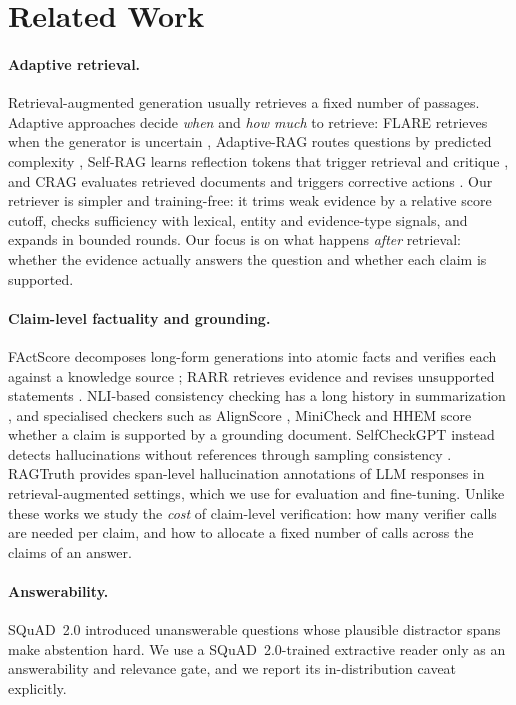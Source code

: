 \section{Related Work}
\label{sec:related}

\paragraph{Adaptive retrieval.}
Retrieval-augmented generation \citep{lewis2020rag} usually retrieves a fixed number of passages.
Adaptive approaches decide \emph{when} and \emph{how much} to retrieve: FLARE retrieves when the generator is uncertain \citep{jiang2023flare}, Adaptive-RAG routes questions by predicted complexity \citep{jeong2024adaptiverag}, Self-RAG learns reflection tokens that trigger retrieval and critique \citep{asai2024selfrag}, and CRAG evaluates retrieved documents and triggers corrective actions \citep{yan2024crag}.
Our retriever is simpler and training-free: it trims weak evidence by a relative score cutoff, checks sufficiency with lexical, entity and evidence-type signals, and expands in bounded rounds.
Our focus is on what happens \emph{after} retrieval: whether the evidence actually answers the question and whether each claim is supported.

\paragraph{Claim-level factuality and grounding.}
FActScore decomposes long-form generations into atomic facts and verifies each against a knowledge source \citep{min2023factscore}; RARR retrieves evidence and revises unsupported statements \citep{gao2023rarr}.
NLI-based consistency checking has a long history in summarization \citep{laban2022summac,honovich2022true}, and specialised checkers such as AlignScore \citep{zha2023alignscore}, MiniCheck \citep{tang2024minicheck} and HHEM \citep{vectara2024hhem} score whether a claim is supported by a grounding document.
SelfCheckGPT instead detects hallucinations without references through sampling consistency \citep{manakul2023selfcheckgpt}.
RAGTruth \citep{niu2024ragtruth} provides span-level hallucination annotations of LLM responses in retrieval-augmented settings, which we use for evaluation and fine-tuning.
Unlike these works we study the \emph{cost} of claim-level verification: how many verifier calls are needed per claim, and how to allocate a fixed number of calls across the claims of an answer.

\paragraph{Answerability.}
SQuAD~2.0 \citep{rajpurkar2018squad2} introduced unanswerable questions whose plausible distractor spans make abstention hard.
We use a SQuAD~2.0-trained extractive reader only as an answerability and relevance gate, and we report its in-distribution caveat explicitly.
